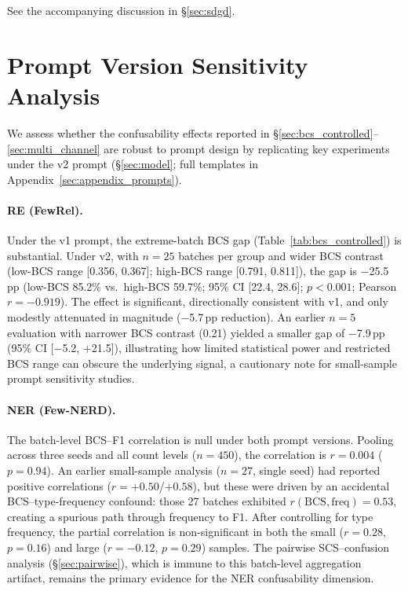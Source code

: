 \documentclass[11pt]{article}
\begin{document}
See the accompanying discussion in \S\ref{sec:sdgd}.



\section{Prompt Version Sensitivity Analysis}
\label{sec:appendix_prompt_sensitivity}

We assess whether the confusability effects reported in \S\ref{sec:bcs_controlled}--\ref{sec:multi_channel} are robust to prompt design by replicating key experiments under the v2 prompt (\S\ref{sec:model}; full templates in Appendix~\ref{sec:appendix_prompts}).

\paragraph{RE (FewRel).}
Under the v1 prompt, the extreme-batch BCS gap (Table~\ref{tab:bcs_controlled}) is substantial. Under v2, with $n{=}25$ batches per group and wider BCS contrast (low-BCS range [0.356, 0.367]; high-BCS range [0.791, 0.811]), the gap is $-$25.5\,pp (low-BCS 85.2\% vs.\ high-BCS 59.7\%; 95\% CI [22.4, 28.6]; $p < 0.001$; Pearson $r = -0.919$). The effect is significant, directionally consistent with v1, and only modestly attenuated in magnitude ($-$5.7\,pp reduction). An earlier $n{=}5$ evaluation with narrower BCS contrast (0.21) yielded a smaller gap of $-$7.9\,pp (95\% CI [$-$5.2, $+$21.5]), illustrating how limited statistical power and restricted BCS range can obscure the underlying signal, a cautionary note for small-sample prompt sensitivity studies.

\paragraph{NER (Few-NERD).}
The batch-level BCS--F1 correlation is null under both prompt versions. Pooling across three seeds and all count levels ($n = 450$), the correlation is $r = 0.004$ ($p = 0.94$). An earlier small-sample analysis ($n = 27$, single seed) had reported positive correlations ($r = +0.50$/$+0.58$), but these were driven by an accidental BCS--type-frequency confound: those 27 batches exhibited $r(\text{BCS}, \text{freq}) = 0.53$, creating a spurious path through frequency to F1. After controlling for type frequency, the partial correlation is non-significant in both the small ($r = 0.28$, $p = 0.16$) and large ($r = -0.12$, $p = 0.29$) samples. The pairwise SCS--confusion analysis (\S\ref{sec:pairwise}), which is immune to this batch-level aggregation artifact, remains the primary evidence for the NER confusability dimension.
\end{document}
